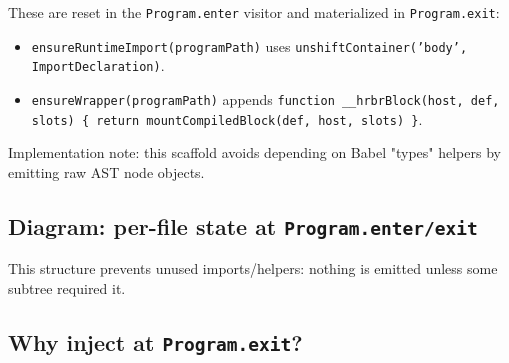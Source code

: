 These are reset in the \texttt{Program.enter} visitor and materialized in \texttt{Program.exit}:

\begin{itemize}
\item \texttt{ensureRuntimeImport(programPath)} uses \texttt{unshiftContainer('body', ImportDeclaration)}.
\item \texttt{ensureWrapper(programPath)} appends \texttt{function \_\_hrbrBlock(host, def, slots) \{ return mountCompiledBlock(def, host, slots) \}}.
\end{itemize}

Implementation note: this scaffold avoids depending on Babel "types" helpers by emitting raw AST node objects.

\subsection*{Diagram: per-file state at \texttt{Program.enter/exit}}
\begin{center}
\end{center}

This structure prevents unused imports/helpers: nothing is emitted unless some subtree required it.

\subsection{Why inject at \texttt{Program.exit}?}

